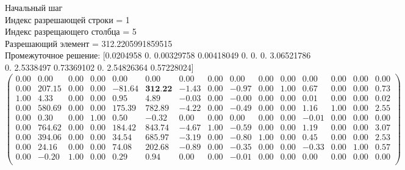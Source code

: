 \documentclass{article}
\begin{document}
\begin{flushleft}
    Начальный шаг \\
Индекс разрешающей строки = 1\\
Индекс разрещающего столбца = 5\\
Разрешающий элемент = 312.2205991859515\\
Промежуточное решение:
 [0.0204958  0.         0.00329758 0.00418049 0.         0.
 0.         3.06521786 0.         2.5338497  0.73369102 0.
 2.54826364 0.57228024]
\begin{equation*}
\begin{pmatrix}
 0.00 &   0.00 & 0.00 & 0.00 &   0.00 &   0.00 &  0.00 & 0.00 &  0.00 & 0.00 & 0.00 &  0.00 & 0.00 & 0.00 & 0.00 \\
 0.00 & 207.15 & 0.00 & 0.00 & -81.64 & \textbf{312.22} & -1.43 & 0.00 & -0.97 & 0.00 & 1.00 &  0.67 & 0.00 & 0.00 & 0.73 \\
 1.00 &   4.33 & 0.00 & 0.00 &   0.95 &   4.89 & -0.03 & 0.00 & -0.00 & 0.00 & 0.00 &  0.01 & 0.00 & 0.00 & 0.02 \\
 0.00 & 580.69 & 0.00 & 0.00 & 175.39 & 782.89 & -4.22 & 0.00 & -0.49 & 0.00 & 0.00 &  1.16 & 1.00 & 0.00 & 2.55 \\
 0.00 &   0.30 & 0.00 & 1.00 &   0.50 &  -0.32 &  0.00 & 0.00 &  0.00 & 0.00 & 0.00 & -0.01 & 0.00 & 0.00 & 0.00 \\
 0.00 & 764.62 & 0.00 & 0.00 & 184.42 & 843.74 & -4.67 & 1.00 & -0.59 & 0.00 & 0.00 &  1.19 & 0.00 & 0.00 & 3.07 \\
 0.00 & 394.06 & 0.00 & 0.00 &  34.54 & 685.97 & -3.19 & 0.00 & -0.80 & 1.00 & 0.00 &  0.45 & 0.00 & 0.00 & 2.53 \\
 0.00 &  24.16 & 0.00 & 0.00 &  74.08 & 202.68 & -0.89 & 0.00 & -0.35 & 0.00 & 0.00 & -0.33 & 0.00 & 1.00 & 0.57 \\
 0.00 &  -0.20 & 1.00 & 0.00 &   0.29 &   0.94 &  0.00 & 0.00 & -0.01 & 0.00 & 0.00 &  0.00 & 0.00 & 0.00 & 0.00 \\
\end{pmatrix}
\end{equation*}
\end{flushleft}
\end{document}

